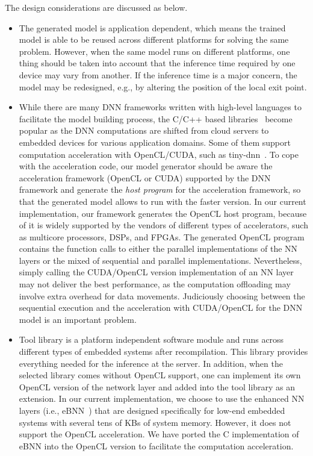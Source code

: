 \documentclass[conference]{IEEEtran}
\begin{document}
The design considerations are discussed as below.
\begin{itemize}
  \item The generated model is application dependent, which means the trained model is able to be reused across different platforms for solving the same problem. However, when the same model runs on different platforms, one thing should be taken into account that the inference time required by one device may vary from another. If the inference time is a major concern, the model may be redesigned, e.g., by altering the position of the local exit point.
  \item While there are many DNN frameworks written with high-level languages to facilitate the model building process, the C/C++ based libraries~\cite{tinydnn,McDanel17} become popular as the DNN computations are shifted from cloud servers to embedded devices for various application domains. Some of them support computation acceleration with OpenCL/CUDA, such as tiny-dnn~\cite{tinydnn}. To cope with the acceleration code, our model generator should be aware the acceleration framework (OpenCL or CUDA) supported by the DNN framework and generate the \emph{host program} for the acceleration framework, so that the generated model allows to run with the faster version. In our current implementation, our framework generates the OpenCL host program, because of it is widely supported by the vendors of different types of accelerators, such as multicore processors, DSPs, and FPGAs. The generated OpenCL program contains the function calls to either the parallel implementations of the NN layers or the mixed of sequential and parallel implementations.
      Nevertheless, simply calling the CUDA/OpenCL version implementation of an NN layer may not deliver the best performance, as the computation offloading may involve extra overhead for data movements. Judiciously choosing between the sequential execution and the acceleration with CUDA/OpenCL for the DNN model is an important problem.
  \item Tool library is a platform independent software module and runs across different types of embedded systems after recompilation. This library provides everything needed for the inference at the server. In addition, when the selected library comes without OpenCL support, one can implement its own OpenCL version of the network layer and added into the tool library as an extension. In our current implementation, we choose to use the enhanced NN layers (i.e., eBNN~\cite{McDanel17}) that are designed specifically for low-end embedded systems with several tens of KBs of system memory. However, it does not support the OpenCL acceleration. We have ported the C implementation of eBNN into the OpenCL version to facilitate the computation acceleration.
\end{itemize}
\end{document}
